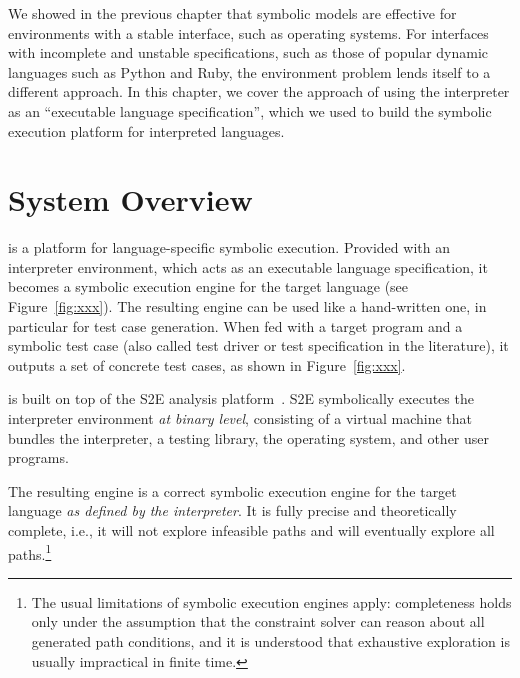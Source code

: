 We showed in the previous chapter that symbolic models are effective for environments with a stable interface, such as operating systems.
%
For interfaces with incomplete and unstable specifications, such as those of popular dynamic languages such as Python and Ruby, the environment problem lends itself to a different approach.
%
In this chapter, we cover the approach of using the interpreter as an ``executable language specification'', which we used to build the \chef symbolic execution platform for interpreted languages.

\section{System Overview}



\chef is a platform for language-specific symbolic execution.  Provided with an interpreter environment, which acts as an executable language specification, it becomes a symbolic execution engine for the target language (see Figure~\ref{fig:xxx}).
%
The resulting engine can be used like a hand-written one, in particular for test case generation.  When fed with a target program and a symbolic test case (also called test driver or test specification in the literature), it outputs a set of concrete test cases, as shown in Figure~\ref{fig:xxx}.


\chef is built on top of the S2E analysis platform~\cite{s2eSystem}.  S2E symbolically executes the interpreter environment \emph{at binary level}, consisting of a virtual machine that bundles the interpreter, a testing library, the operating system, and other user programs.

The resulting engine is a correct symbolic execution engine for the target language \emph{as defined by the interpreter}.  It is fully precise and theoretically complete, i.e., it will not explore infeasible paths and will eventually explore all paths.\footnote{The usual limitations of symbolic execution engines apply: completeness holds only under the assumption that the constraint solver can reason about all generated path conditions, and it is understood that exhaustive exploration is usually impractical in finite time.}

